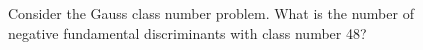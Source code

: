 \begin{figure}[t]
\centering
\setlength{\columnsep}{12pt}
\setlength{\colw}{\dimexpr(\linewidth-2\columnsep)/3\relax}
\begin{promptrow}
\caret{}\par\vspace{4pt}
Consider the Gauss class number problem. What is the number of negative fundamental discriminants with class number 48?
\par\vspace{6pt}
{}\par\vspace{3pt}
{\monofont\footnotesize {}}
\end{promptrow}

\vspace{12pt}


\end{figure}
